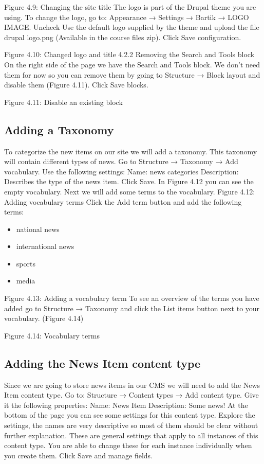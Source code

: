 Figure 4.9: Changing the site title
The logo is part of the Drupal theme you are using. To change the logo, go to: Appearance → Settings → Bartik → LOGO IMAGE. Uncheck Use the default logo supplied by the theme and upload the file drupal \textunderscore logo.png (Available in the course files zip). Click Save configuration.

Figure 4.10: Changed logo and title
4.2.2	Removing the Search and Tools block
On the right side of the page we have the Search and Tools block. We don’t need them for now so you can remove them by going to Structure → Block layout and disable  them (Figure 4.11). Click Save blocks.

Figure 4.11: Disable an existing block 
\subsection{Adding a Taxonomy}
To categorize the new items on our site we will add a taxonomy. This taxonomy will contain different types of news. Go to Structure → Taxonomy → Add vocabulary. Use the following settings:
Name: news categories
Description: Describes the type of the news item.
Click Save. In Figure 4.12 you can see the empty vocabulary. Next we will add some terms to the vocabulary. 
Figure 4.12: Adding vocabulary terms
Click the Add term button and add the following terms:
\begin{itemize}
    \item national news
    \item international news
    \item sports 
    \item media
\end{itemize}


Figure 4.13: Adding a vocabulary term
To see an overview of the terms you have added go to Structure → Taxonomy and click the List items button next to your vocabulary. (Figure 4.14)

Figure 4.14: Vocabulary terms
\subsection{Adding the News Item content type}
Since we are going to store news items in our CMS we will need to add the News Item content type. Go to: Structure → Content types → Add content type.
Give it the following properties:
Name: News Item
Description: Some news!
At the bottom of the page you can see some settings for this content type. Explore the settings, the names are very descriptive so most of them should be clear without further explanation. These are general settings that apply to all instances of this content type. You are able to change these for each instance individually when you create them.
Click Save and manage fields.

